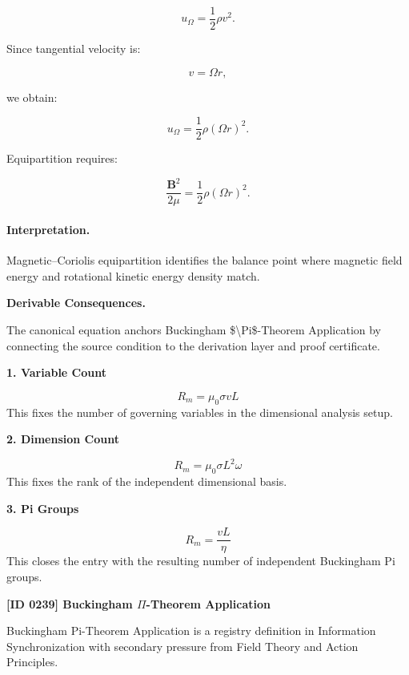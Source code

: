 \begin{equation}
u_{\Omega}
=
\frac{1}{2}\rho v^2 .
\end{equation}

Since tangential velocity is:

\begin{equation}
v=\Omega r,
\end{equation}

we obtain:

\begin{equation}
u_{\Omega}
=
\frac{1}{2}\rho(\Omega r)^2 .
\end{equation}

Equipartition requires:

\begin{equation}
\boxed{
\frac{\mathbf{B}^2}{2\mu}
=
\frac{1}{2}\rho(\Omega r)^2 .
}
\end{equation}

\paragraph{Interpretation.}
Magnetic--Coriolis equipartition identifies the balance point where magnetic field energy and rotational kinetic energy density match.

\par\vspace{0.35em}
\noindent\textbf{Derivable Consequences.}\quad
\begingroup
\footnotesize
\raggedright
The canonical equation anchors Buckingham \$\textbackslash{}Pi\$-Theorem Application by connecting the source condition to the derivation layer and proof certificate.
\par\endgroup

\noindent\textbf{1. Variable Count}\par
\[
R_m=\mu_0\sigma vL
\]
\noindent This fixes the number of governing variables in the dimensional analysis setup.\par
\noindent\textbf{2. Dimension Count}\par
\[
R_m=\mu_0\sigma L^2\omega
\]
\noindent This fixes the rank of the independent dimensional basis.\par
\noindent\textbf{3. Pi Groups}\par
\[
R_m=\frac{vL}{\eta}
\]
\noindent This closes the entry with the resulting number of independent Buckingham Pi groups.\par

\clearpage
\noindent\textbf{[ID 0239] Buckingham $\Pi$-Theorem Application}\par
\vspace{0.35em}
\begingroup\small
{}
Buckingham Pi-Theorem Application is a registry definition in Information Synchronization with secondary pressure from Field Theory and Action Principles.

